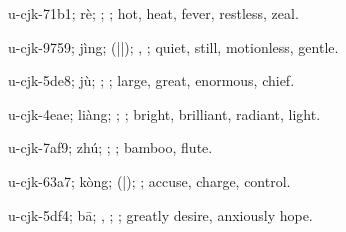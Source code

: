 \begin{multicols}{2}
{\cjkgGlue{}u-cjk-71b1; rè; \cjkgGlue{}\cjkgGlue{}\cjkgGlue{}; \cjkgGlue{}; hot, heat, fever, restless, zeal.

\cjkgGlue{}u-cjk-9759; jìng; \cjkgGlue{}\cjkgGlue{}(\cjkgGlue{}|\cjkgGlue{}|\cjkgGlue{}); \cjkgGlue{}, \cjkgGlue{}; quiet, still, motionless, gentle.

\cjkgGlue{}u-cjk-5de8; jù; \cjkgGlue{}; \cjkgGlue{}; large, great, enormous, chief.

\cjkgGlue{}u-cjk-4eae; liàng; \cjkgGlue{}; \cjkgGlue{}; bright, brilliant, radiant, light.

\cjkgGlue{}u-cjk-7af9; zhú; \cjkgGlue{}; \cjkgGlue{}; bamboo, flute.

\cjkgGlue{}u-cjk-63a7; kòng; \cjkgGlue{}\cjkgGlue{}(\cjkgGlue{}|\cjkgGlue{}); \cjkgGlue{}; accuse, charge, control.

\cjkgGlue{}u-cjk-5df4; bā; \cjkgGlue{}, \cjkgGlue{}; \cjkgGlue{}; greatly desire, anxiously hope.

}
\end{multicols}
